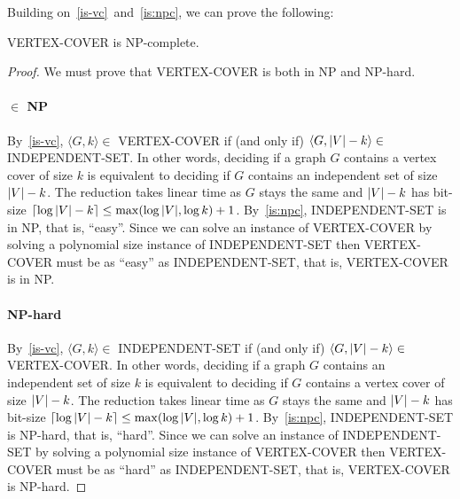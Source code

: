 Building on~\ref{is-vc}~and~\ref{is:npc}, we can prove the following:
\begin{theorem}\label{vc:npc}
VERTEX-COVER is NP-complete.
\end{theorem}

\begin{proof}
  We must prove that VERTEX-COVER is both in NP and NP-hard.
  \paragraph{$\in$ NP}
  By~\ref{is-vc}, $\langle G,k \rangle \in$ VERTEX-COVER if (and only if)
  $\langle G,|V|-k\rangle \in$ INDEPENDENT-SET.
  In other words, deciding if a graph $G$ contains a vertex cover of size $k$ is
  equivalent to deciding if $G$ contains an
  independent set of size $|V|-k$. The reduction takes linear time as $G$ stays the
  same and $|V|-k$ has bit-size $\lceil\log |V| - k\rceil \le
  \max(\log|V|,\log k) + 1$.
  By~\ref{is:npc}, INDEPENDENT-SET is in NP, that is, ``easy''. Since
  we can solve an instance of VERTEX-COVER by solving a polynomial size instance of
  INDEPENDENT-SET then VERTEX-COVER must be as ``easy'' as INDEPENDENT-SET, that
  is, VERTEX-COVER is in NP.

  \paragraph{NP-hard}
  By~\ref{is-vc}, $\langle G,k \rangle \in$ INDEPENDENT-SET if (and only if)
  $\langle G,|V|-k\rangle \in$ VERTEX-COVER.
  In other words, deciding if a graph $G$ contains an independent set of size $k$ is
  equivalent to deciding if $G$ contains a
  vertex cover of size $|V|-k$. The reduction takes linear time as $G$ stays the
  same and $|V|-k$ has bit-size $\lceil\log |V| - k\rceil \le
  \max(\log|V|,\log k) + 1$.
  By~\ref{is:npc}, INDEPENDENT-SET is NP-hard, that is, ``hard''. Since
  we can solve an instance of INDEPENDENT-SET by solving a polynomial size instance of
  VERTEX-COVER then VERTEX-COVER must be as ``hard'' as INDEPENDENT-SET, that
  is, VERTEX-COVER is NP-hard.
\end{proof}
